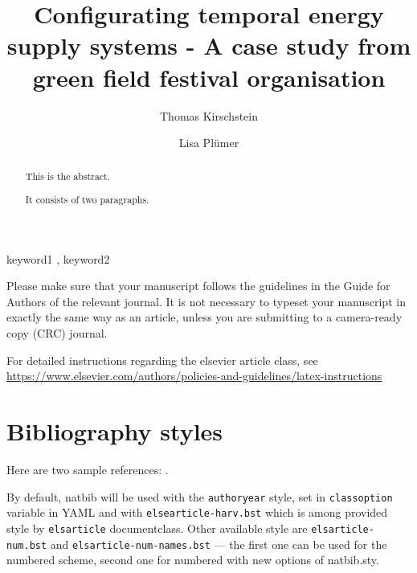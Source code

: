 \documentclass[preprint, 3p,
authoryear]{elsarticle} %
\begin{document}
\begin{frontmatter}

  \title{Configurating temporal energy supply systems - A case study
from green field festival organisation}
    \author[Fraunhofer IKTS - CEM]{Thomas Kirschstein%
  }
    \author[Fraunhofer IKTS - CEM]{Lisa Plümer%
  }
  
  \begin{abstract}
  This is the abstract.

  It consists of two paragraphs.
  \end{abstract}
    \begin{keyword}
    keyword1 \sep 
    keyword2
  \end{keyword}
  
 \end{frontmatter}

Please make sure that your manuscript follows the guidelines in the
Guide for Authors of the relevant journal. It is not necessary to
typeset your manuscript in exactly the same way as an article, unless
you are submitting to a camera-ready copy (CRC) journal.

For detailed instructions regarding the elsevier article class, see
\url{https://www.elsevier.com/authors/policies-and-guidelines/latex-instructions}

\section{Bibliography styles}\label{bibliography-styles}

Here are two sample references:
\citep{Nair1993_IntroAgroforestry, Toensmeier2017_Carbon_Agroforestry}.

By default, natbib will be used with the \texttt{authoryear} style, set
in \texttt{classoption} variable in YAML and with
\texttt{elsearticle-harv.bst} which is among provided style by
\texttt{elsarticle} documentclass. Other available style are
\texttt{elsarticle-num.bst} and \texttt{elsarticle-num-names.bst} ---
the first one can be used for the numbered scheme, second one for
numbered with new options of natbib.sty.
\end{document}
